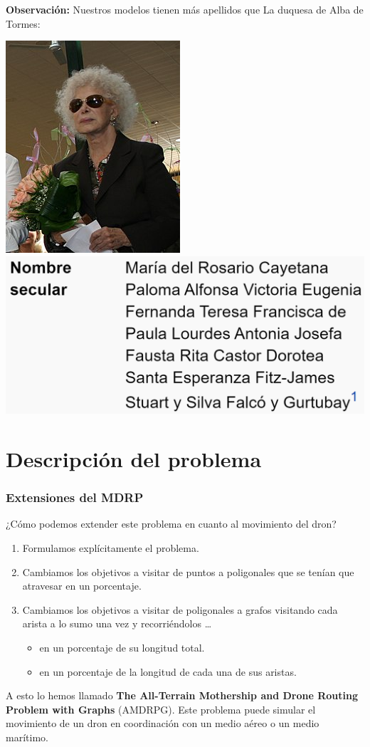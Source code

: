 \documentclass[slidestop,usepdftitle=false, xcolor=table]{beamer}
\begin{document}
	\begin{frame}
		\textbf{Observación:} Nuestros modelos tienen más apellidos que La duquesa de Alba de Tormes:
		\begin{center}
			\includegraphics[width=0.4\linewidth]{duquesa2}\includegraphics[width=0.4\linewidth]{apellidos_duquesa}
		\end{center}
	\end{frame}

	\section{Descripción del problema}
	\begin{frame}
		\frametitle{Extensiones del MDRP}
		¿Cómo podemos extender este problema en cuanto al movimiento del dron?
		\begin{enumerate}
			\item Formulamos explícitamente el problema.
			\pause
			\item Cambiamos los objetivos a visitar de puntos a poligonales que se tenían que atravesar en un porcentaje.
			\pause
			\item Cambiamos los objetivos a visitar de poligonales a grafos visitando cada arista a lo sumo una vez y recorriéndolos \ldots
			\begin{itemize}
				\item en un porcentaje de su longitud total.
				\item en un porcentaje de la longitud de cada una de sus aristas.
			\end{itemize}
		\end{enumerate}
		A esto lo hemos llamado \textbf{The All-Terrain Mothership and Drone Routing Problem with Graphs} (AMDRPG). Este problema puede simular el movimiento de un dron en coordinación con un medio aéreo o un medio marítimo.
	\end{frame}
\end{document}
